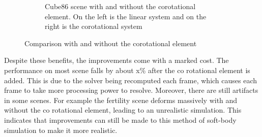 \documentclass[11pt,a4paper]{article}
\begin{document}
\begin{figure}[t]
\begin{subfigure}[b]{0.6\textwidth}
    \caption{Cube86 scene with and without the corotational element. On the left is the linear system and on the right is the corotational system}
    \label{subfig:deform-cube86}
  \end{subfigure} 
  \caption{Comparison with and without the corotational element}
  \label{fig:comparison-deformation}
\end{figure}

Despite these benefits, the improvements come with a marked cost. 
The performance on most scene falls by about x\% after the co rotational element is added. 
This is due to the solver being recomputed each frame, which causes each frame to take more processing power to resolve. 
Moreover, there are still artifacts in some scenes. 
For example the fertility scene deforms massively with and without the co rotational element, leading to an unrealistic simulation. 
This indicates that improvements can still be made to this method of soft-body simulation to make it more realistic. 
\end{document}
